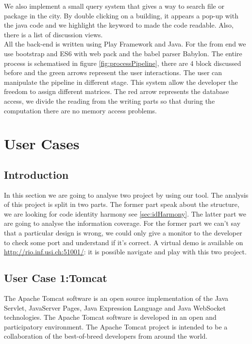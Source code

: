\documentclass[]{usiinfbachelorproject}
\begin{document}
We also implement a small query system that gives a way to search file or package in the city. By double clicking on a building, it appears a pop-up with the java code and we highlight the keyword to made the code readable. Also, there is a list of discussion views.\\
All the back-end is written using Play Framework and Java.  For the from end we use bootstrap and ES6 with web pack  and the babel parser Babylon.
The entire process is schematised in figure \ref{fig:processPipeline}, there are 4 block discussed before and the green arrows represent the user interactions. The user can manipulate the pipeline in different stage. This system allow the developer the freedom to assign different matrices.
The red arrow represents the database access, we divide the reading from the writing parts so that  during the computation there are no memory access problems. 





   





\newpage
\section{User Cases} \label{evaluation}

\subsection{Introduction}
In this section we are going to analyse two project by using our tool. 
The analysis of this project is split in two parts. The former part speak about the structure, we are looking  for code identity harmony see \ref{sec:idHarmony}. The latter part we are going to analyse the information coverage. 
For the former part we can't say that a particular design is wrong, we could only give a monitor to the developer to check some port and understand if it's correct.
A virtual demo is available on \url{http://rio.inf.usi.ch:51001/}: it is possible  navigate and play with this two project. 

\subsection{User Case 1:Tomcat}
The Apache Tomcat software is an open source implementation of the Java Servlet, JavaServer Pages, Java Expression Language and Java WebSocket technologies. 
The Apache Tomcat software is developed in an open and participatory environment. The Apache Tomcat project is intended to be a collaboration of the best-of-breed developers from around the world.
\end{document}
